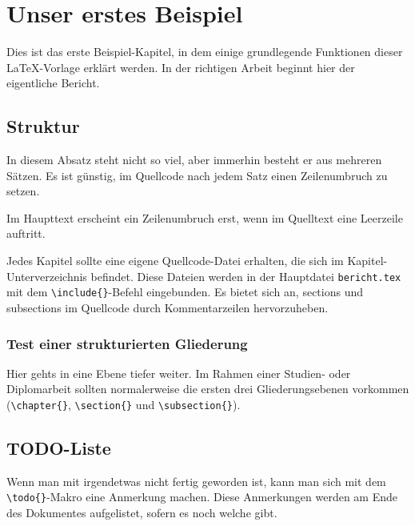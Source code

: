 %
%

\newcommand{\makro}[1]{\texttt{\textbackslash{}#1\{\}}}

\chapter{Unser erstes Beispiel}
\label{sec:Beispiel}

Dies ist das erste Beispiel-Kapitel, in dem einige grundlegende Funktionen dieser \LaTeX{}-Vorlage erklärt werden.
In der richtigen Arbeit beginnt hier der eigentliche Bericht.

\section{Struktur}
\label{sec:Struktur}

In diesem Absatz steht nicht so viel, aber immerhin besteht er aus mehreren Sätzen.
Es ist günstig, im Quellcode nach jedem Satz einen Zeilenumbruch zu setzen.

Im Haupttext erscheint ein Zeilenumbruch erst, wenn im Quelltext eine Leerzeile auftritt.

Jedes Kapitel sollte eine eigene Quellcode-Datei erhalten, die sich im Ka\-pi\-tel-Un\-ter\-ver\-zeich\-nis befindet.
Diese Dateien werden in der Hauptdatei \texttt{bericht.tex} mit dem \makro{include}-Befehl eingebunden.
Es bietet sich an, sections und subsections im Quellcode durch Kommentarzeilen hervorzuheben.

\subsection{Test einer strukturierten Gliederung}
\label{sec:GliederungsTest}
Hier gehts in eine Ebene tiefer weiter. 
Im Rahmen einer Studien- oder Diplomarbeit sollten normalerweise die ersten drei Gliederungsebenen vorkommen (\makro{chapter}, \makro{section} und \makro{subsection}).

\section{TODO-Liste}
Wenn man mit irgendetwas nicht fertig geworden ist, kann man sich mit dem \makro{todo}-Makro eine Anmerkung machen.
Diese Anmerkungen werden am Ende des Dokumentes aufgelistet, sofern es noch welche gibt.

